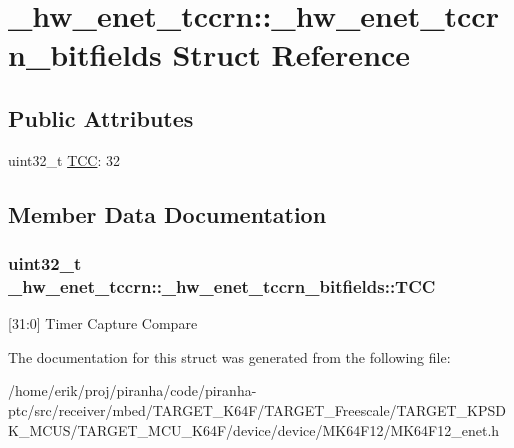 \hypertarget{struct__hw__enet__tccrn_1_1__hw__enet__tccrn__bitfields}{}\section{\+\_\+hw\+\_\+enet\+\_\+tccrn\+:\+:\+\_\+hw\+\_\+enet\+\_\+tccrn\+\_\+bitfields Struct Reference}
\label{struct__hw__enet__tccrn_1_1__hw__enet__tccrn__bitfields}
\subsection*{Public Attributes}
\begin{DoxyCompactItemize}
\item 
uint32\+\_\+t \hyperlink{struct__hw__enet__tccrn_1_1__hw__enet__tccrn__bitfields_a5ea975ed0585c39038a8179915cdc71b}{T\+CC}\+: 32
\end{DoxyCompactItemize}


\subsection{Member Data Documentation}
\subsubsection[{\texorpdfstring{T\+CC}{TCC}}]{\setlength{\rightskip}{0pt plus 5cm}uint32\+\_\+t \+\_\+hw\+\_\+enet\+\_\+tccrn\+::\+\_\+hw\+\_\+enet\+\_\+tccrn\+\_\+bitfields\+::\+T\+CC}\hypertarget{struct__hw__enet__tccrn_1_1__hw__enet__tccrn__bitfields_a5ea975ed0585c39038a8179915cdc71b}{}\label{struct__hw__enet__tccrn_1_1__hw__enet__tccrn__bitfields_a5ea975ed0585c39038a8179915cdc71b}
\mbox{[}31\+:0\mbox{]} Timer Capture Compare 

The documentation for this struct was generated from the following file\+:\begin{DoxyCompactItemize}
\item 
/home/erik/proj/piranha/code/piranha-\/ptc/src/receiver/mbed/\+T\+A\+R\+G\+E\+T\+\_\+\+K64\+F/\+T\+A\+R\+G\+E\+T\+\_\+\+Freescale/\+T\+A\+R\+G\+E\+T\+\_\+\+K\+P\+S\+D\+K\+\_\+\+M\+C\+U\+S/\+T\+A\+R\+G\+E\+T\+\_\+\+M\+C\+U\+\_\+\+K64\+F/device/device/\+M\+K64\+F12/M\+K64\+F12\+\_\+enet.\+h\end{DoxyCompactItemize}
